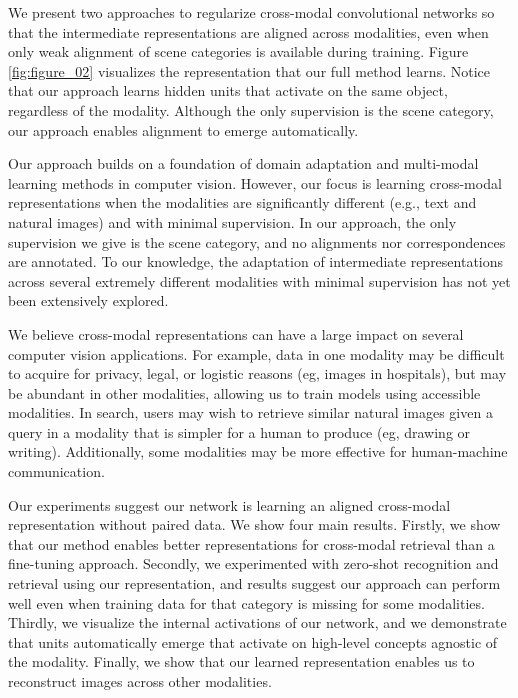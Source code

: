 \documentclass[10pt,journal,compsoc]{IEEEtran}
\begin{document}
    We present two approaches to regularize cross-modal convolutional networks so that the intermediate representations are aligned across modalities, even when only weak alignment of scene categories is available during training. Figure \ref{fig:figure_02} visualizes the representation that our full method learns. Notice that our approach learns hidden units that activate on the same object, regardless of the modality. Although the only supervision is the scene category, our approach enables alignment to emerge automatically.
    
    Our approach builds on a foundation of domain adaptation \cite{saenko2010adapting,gopalan2011domain} and multi-modal learning \cite{frome2013devise,norouzi2013zero,socher2013zero} methods in computer vision. However, our focus is learning cross-modal representations when the modalities are significantly different (e.g., text and natural images) and with minimal supervision. In our approach, the only supervision we give is the scene category, and no alignments nor correspondences are annotated. To our knowledge, the adaptation of intermediate representations across several extremely different modalities with minimal supervision has not yet been extensively explored.
    
    We believe cross-modal representations can have a large impact on several computer vision applications.  For example, data in one modality may be difficult to acquire for privacy, legal, or logistic reasons (eg, images in hospitals), but may be abundant in other modalities, allowing us to train models using accessible modalities. In search, users may wish to retrieve similar natural images given a query in a modality that is simpler for a human to produce (eg, drawing or writing). Additionally, some modalities may be more effective for human-machine communication. 
    
    Our experiments suggest our network is learning an aligned cross-modal representation without paired data. We show four main results. Firstly, we show that our method enables better representations for cross-modal retrieval than a fine-tuning approach. Secondly, we experimented with zero-shot recognition and retrieval using our representation, and results suggest our approach can perform well even when training data for that category is missing for some modalities. Thirdly, we visualize the internal activations of our network, and we demonstrate that units automatically emerge that activate on high-level concepts agnostic of the modality. Finally, we show that our learned representation enables us to reconstruct images across other modalities. 
 
\end{document}
